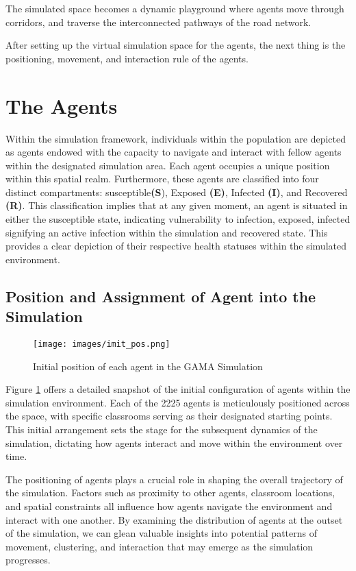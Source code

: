  The simulated space becomes a dynamic playground where agents move through corridors,  and traverse the interconnected pathways of the road network. 
 
 After setting up the virtual simulation space for the agents, the next thing is the positioning, movement, and interaction rule of the agents. 
 
 
 \section{ The Agents}
 Within the simulation framework, individuals within the population are depicted as agents endowed with the capacity to navigate and interact with fellow agents within the designated simulation area. Each agent occupies a unique position within this spatial realm. Furthermore, these agents are classified into four distinct compartments: susceptible\textbf{(S}), Exposed \textbf{(E)}, Infected \textbf{(I)}, and Recovered \textbf{(R)}. This classification implies that at any given moment, an agent is situated in either the susceptible state, indicating vulnerability to infection, exposed, infected signifying an active infection within the simulation and recovered state. This provides a clear depiction of their respective health statuses within the simulated environment.
 
 \subsection{Position and Assignment of Agent into the Simulation}
 
 \begin{figure}[H]
 	\centering
 	\texttt{[image: images/imit\_pos.png]}
 	\caption{Initial position of each agent in the GAMA Simulation}
 	\label{init}
 \end{figure}
 
 Figure \ref{init} offers a detailed snapshot of the initial configuration of agents within the simulation environment. Each of the 2225 agents is meticulously positioned across the space, with specific classrooms serving as their designated starting points. This initial arrangement sets the stage for the subsequent dynamics of the simulation, dictating how agents interact and move within the environment over time.
 
 The positioning of agents plays a crucial role in shaping the overall trajectory of the simulation. Factors such as proximity to other agents, classroom locations, and spatial constraints all influence how agents navigate the environment and interact with one another. By examining the distribution of agents at the outset of the simulation, we can glean valuable insights into potential patterns of movement, clustering, and interaction that may emerge as the simulation progresses.
 
